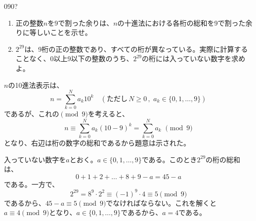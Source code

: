 \begin{prob}{090}{\hosi ?}{}
 \begin{enumerate}
  \item 正の整数$n$を9で割った余りは、$n$の十進法における各桁の総和を9で割った余りに等しいことを示せ。
  \item $2^{29}$は、9桁の正の整数であり、すべての桁が異なっている。実際に計算することなく、0以上9以下の整数のうち、$2^{29}$の桁には入っていない数字を求めよ。
 \end{enumerate}
\end{prob}

$n$の10進法表示は、
\[ n=\sum_{k=0}^N a_k 10^k \quad(\text{ただし}\, N\ge 0 \,,\,\, a_k\in\{0, 1, \dots, 9\}) \]
であるが、これの$\pmod{9}$を考えると、
\[ n\equiv \sum_{k=0}^N a_k(10-9)^k=\sum_{k=0}^N a_k \,\,\pmod{9} \]
となり、右辺は桁の数字の総和であるから題意は示された。

入っていない数字を$a$とおく。$a\in\{0, 1, \dots, 9\}$である。このとき$2^{29}$の桁の総和は、
\[ 0+1+2+\dots+8+9-a=45-a \]
である。一方で、
\[ 2^{29}=8^9\cdot2^2\equiv (-1)^9\cdot 4\equiv 5 \pmod{9} \]
であるから、$45-a\equiv 5 \pmod{9}$でなければならない。これを解くと$a\equiv 4 \pmod{9}$となり、$a\in\{0, 1, \dots, 9\}$であるから、$a=4$である。